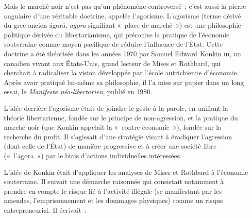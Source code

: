 
Mais le marché noir n'est pas qu'un phénomène controversé~; c'est aussi la pierre angulaire d'une véritable doctrine, appelée l'agorisme. L'agorisme (terme dérivé du grec ancien \foreignlanguage{greek}{ágorá}, \emph{agora} signifiant «~place de marché~») est une philosophie politique dérivée du libertarianisme, qui préconise la pratique de l'économie souterraine comme moyen pacifique de réduire l'influence de l'État. Cette doctrine a été théorisée dans les années 1970 par Samuel Edward Konkin \textsc{iii}, un canadien vivant aux États-Unis, grand lecteur de Mises et Rothbard, qui cherchait à radicaliser la vision développée par l'école autrichienne d'économie. Après avoir pratiqué lui-même sa philosophie, il l'a mise sur papier dans un long essai, le \emph{Manifeste néo-libertarien}, publié en 1980.

L'idée derrière l'agorisme était de joindre le geste à la parole, en unifiant la théorie libertarienne, fondée sur le principe de non-agression, et la pratique du marché noir (que Konkin appelait la «~contre-économie~»), fondée sur la recherche du profit. Il s'agissait d'une stratégie visant à éradiquer l'agression (dont celle de l'État) de manière progressive et à créer une société libre («~l'agora~») par le biais d'actions individuelles intéressées.

L'idée de Konkin était d'appliquer les analyses de Mises et Rothbard à l'économie souterraine. Il suivait une démarche raisonnée qui consistait notamment à prendre en compte le risque lié à l'activité illégale (se manifestant par les amendes, l'emprisonnement et les dommages physiques) comme un risque entrepreneurial. Il écrivait~:

